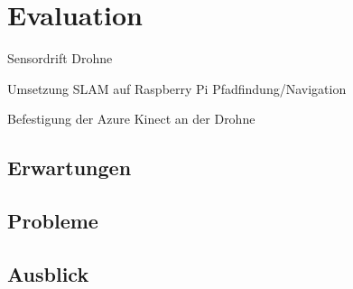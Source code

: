 \chapter{Evaluation}


Sensordrift Drohne

Umsetzung SLAM auf Raspberry Pi
Pfadfindung/Navigation

Befestigung der Azure Kinect an der Drohne




\section{Erwartungen}

\section{Probleme}




\section{Ausblick}